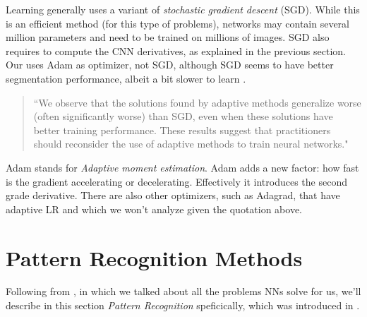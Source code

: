 Learning generally uses a variant of \emph{stochastic gradient descent} (SGD). While this is an efficient method (for this type of problems), networks may contain several million parameters and need to be trained on millions of images. SGD also requires to compute the CNN derivatives, as explained in the previous section. Our \maskrcnn uses Adam as optimizer, not SGD, although SGD seems to have better segmentation performance, albeit a bit slower to learn \cite{wilson2017marginal}.
\begin{quotation}“We observe that the solutions found by adaptive methods generalize worse (often significantly worse) than SGD, even when these solutions have better training performance. These results suggest that practitioners should reconsider the use of adaptive methods to train neural networks."
\end{quotation}

Adam stands for \emph{Adaptive moment estimation}. Adam adds a new factor: how fast is the gradient accelerating or decelerating. Effectively it introduces the second grade derivative.
There are also other optimizers, such as Adagrad, that have adaptive LR and which we won't analyze given the quotation above.

\section{Pattern Recognition Methods}\label{s:patt}

Following from , in which we talked about all the problems NNs solve for us, we'll describe in this section \emph{Pattern Recognition} speficically, which was introduced in .


